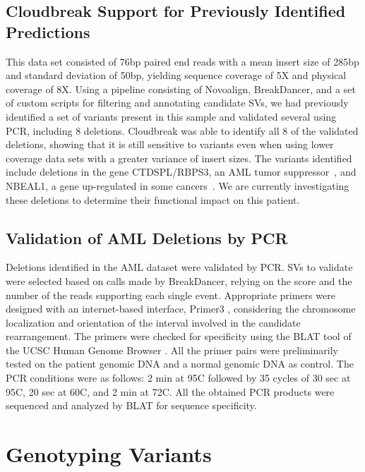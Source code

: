 \subsection{Cloudbreak Support for Previously Identified Predictions}

This data set consisted of 76bp paired end reads with a mean insert size of 285bp and standard deviation of 50bp, yielding sequence coverage of 5X and physical coverage of 8X. Using a pipeline consisting of Novoalign, BreakDancer, and a set of custom scripts for filtering and annotating candidate SVs, we had previously identified a set of variants present in this sample and validated several using PCR, including 8 deletions. Cloudbreak was able to identify all 8 of the validated deletions, showing that it is still sensitive to variants even when using lower coverage data sets with a greater variance of insert sizes. The variants identified include deletions in the gene CTDSPL/RBPS3, an AML tumor suppressor~\cite{Zheng:2012kk}, and NBEAL1, a gene up-regulated in some cancers~\cite{Chen:2004jo}. We are currently investigating these deletions to determine their functional impact on this patient. 

\subsection{Validation of AML Deletions by PCR}

Deletions identified in the AML dataset were validated by PCR. SVs to validate were selected based on calls made by BreakDancer, relying on the score and the number of the reads supporting each single event. Appropriate primers were designed with an internet-based interface, Primer3 \cite{primer3}, considering the chromosome localization and orientation of the interval involved in the candidate rearrangement. The primers were checked for specificity using the BLAT tool of the UCSC Human Genome Browser \cite{BLAT}. All the primer pairs were preliminarily tested on the patient genomic DNA and a normal genomic DNA as control. The PCR conditions were as follows: 2 min at 95\degree C followed by 35 cycles of 30 sec at 95\degree C, 20 sec at 60\degree C, and 2 min at 72\degree C. All the obtained PCR products were sequenced and analyzed by BLAT for sequence specificity. 


\section{Genotyping Variants}

